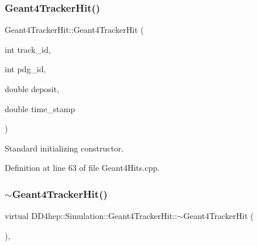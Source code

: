 \hypertarget{class_d_d4hep_1_1_simulation_1_1_geant4_tracker_hit_a0c4153d51119c6b58e6318ff7d9a9a1b}{}\label{class_d_d4hep_1_1_simulation_1_1_geant4_tracker_hit_a0c4153d51119c6b58e6318ff7d9a9a1b} 
\subsubsection{\texorpdfstring{Geant4\+Tracker\+Hit()}{Geant4TrackerHit()}\hspace{0.1cm}{\footnotesize\ttfamily [2/2]}}
{\footnotesize\ttfamily Geant4\+Tracker\+Hit\+::\+Geant4\+Tracker\+Hit (\begin{DoxyParamCaption}\item[{int}]{track\+\_\+id,  }\item[{int}]{pdg\+\_\+id,  }\item[{double}]{deposit,  }\item[{double}]{time\+\_\+stamp }\end{DoxyParamCaption})}



Standard initializing constructor. 



Definition at line 63 of file Geant4\+Hits.\+cpp.

\hypertarget{class_d_d4hep_1_1_simulation_1_1_geant4_tracker_hit_a4f4febb374cab1cb2e8a0463b84c165e}{}\label{class_d_d4hep_1_1_simulation_1_1_geant4_tracker_hit_a4f4febb374cab1cb2e8a0463b84c165e} 
\subsubsection{\texorpdfstring{$\sim$\+Geant4\+Tracker\+Hit()}{~Geant4TrackerHit()}}
{\footnotesize\ttfamily virtual D\+D4hep\+::\+Simulation\+::\+Geant4\+Tracker\+Hit\+::$\sim$\+Geant4\+Tracker\+Hit (\begin{DoxyParamCaption}{ }\end{DoxyParamCaption})\hspace{0.3cm}{\ttfamily [inline]}, {\ttfamily [virtual]}}



